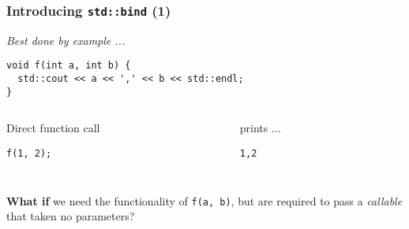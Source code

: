 \begin{frame}[fragile]
  \frametitle{Introducing \texttt{std::bind} (1)}

  \textit{Best done by example ...}

  \begin{block}{}
\begin{verbatim}
void f(int a, int b) {
  std::cout << a << ',' << b << std::endl;
}
\end{verbatim}
  \end{block}

  \begin{columns}[t]

    \begin{column}{.6\textwidth}
      \begin{block}{Direct function call}
\begin{verbatim}
f(1, 2);
\end{verbatim}
      \end{block}
    \end{column}

    \begin{column}{.3\textwidth}
      \begin{block}{prints ...}
\begin{verbatim}
1,2
\end{verbatim}
      \end{block}
    \end{column}

  \end{columns}

\begin{verbatim}
\end{verbatim}

\textbf{What if} we need the functionality of \texttt{f(a, b)}, but
  are required to pass a \textit{callable} that taken no parameters?

\end{frame}

